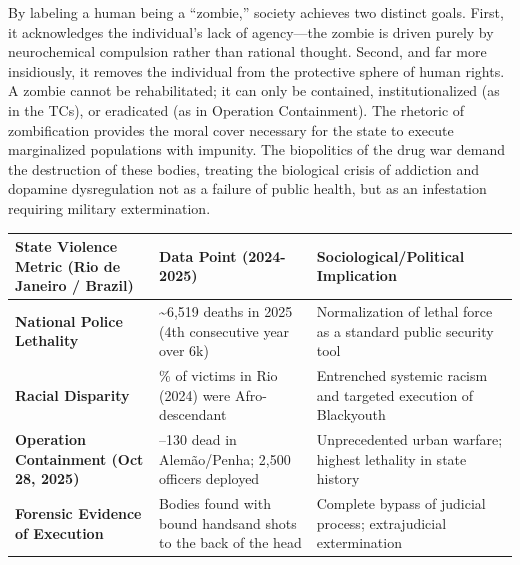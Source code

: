 By labeling a human being a ``zombie,'' society achieves two distinct goals. First, it acknowledges the individual's lack of agency---the zombie is driven purely by neurochemical compulsion rather than rational thought. Second, and far more insidiously, it removes the individual from the protective sphere of human rights. A zombie cannot be rehabilitated; it can only be contained, institutionalized (as in the TCs), or eradicated (as in Operation Containment). The rhetoric of zombification provides the moral cover necessary for the state to execute marginalized populations with impunity. The biopolitics of the drug war demand the destruction of these bodies, treating the biological crisis of addiction and dopamine dysregulation not as a failure of public health, but as an infestation requiring military extermination.

{\def\LTcaptype{none} %
\begin{longtable}[]{@{}
  >{\raggedright\arraybackslash}p{}
  >{\raggedright\arraybackslash}p{}
  >{\raggedright\arraybackslash}p{}@{}}
\toprule\noalign{}
\begin{minipage}[b]{\linewidth}\raggedright
State Violence Metric (Rio de Janeiro / Brazil)
\end{minipage} & \begin{minipage}[b]{\linewidth}\raggedright
Data Point (2024-2025)
\end{minipage} & \begin{minipage}[b]{\linewidth}\raggedright
Sociological/Political Implication
\end{minipage} \\
\midrule\noalign{}
\endhead
\bottomrule\noalign{}
\endlastfoot
\textbf{National Police Lethality} & \textasciitilde6,519 deaths in 2025 (4th consecutive year over 6k) & Normalization of lethal force as a standard public security tool \\
\textbf{Racial Disparity} & 86\% of victims in Rio (2024) were Afro-descendant & Entrenched systemic racism and targeted execution of Blackyouth \\
\textbf{Operation Containment (Oct 28, 2025)} & 121--130 dead in Alemão/Penha; 2,500 officers deployed & Unprecedented urban warfare; highest lethality in state history \\
\textbf{Forensic Evidence of Execution} & Bodies found with bound handsand shots to the back of the head & Complete bypass of judicial process; extrajudicial extermination \\
\end{longtable}
}

